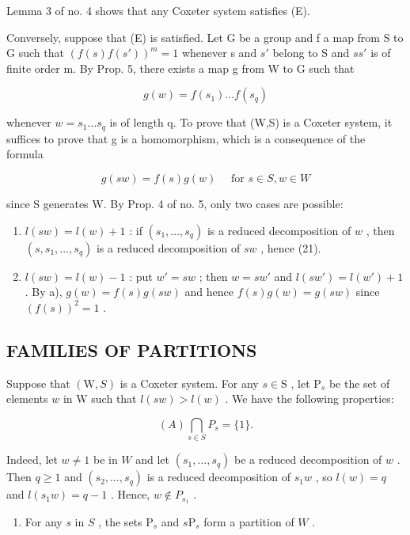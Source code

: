 Lemma 3 of no. 4 shows that any Coxeter system satisfies (E).

Conversely, suppose that (E) is satisfied. Let G be a group and f a map from S to G such that \((f(s)f(s'))^{m}=1\) whenever s and \(s'\) belong to S and \(ss'\) is of finite order m. By Prop. 5, there exists a map g from W to G such that

\[
g (w) = f (s _ {1}) \dots f (s _ {q})\tag{20}
\]

whenever \(w = s_{1} \ldots s_{q}\) is of length q. To prove that (W,S) is a Coxeter system, it suffices to prove that g is a homomorphism, which is a consequence of the formula

\[
g (s w) = f (s) g (w) \quad \text { for } s \in S, w \in W\tag{21}
\]

since S generates W. By Prop. 4 of no. 5, only two cases are possible:

\begin{enumerate}
\def\labelenumi{\alph{enumi})}
\item
  \(l(sw) = l(w) + 1\) : if \((s_1, \ldots, s_q)\) is a reduced decomposition of \(w\) , then \((s, s_1, \ldots, s_q)\) is a reduced decomposition of \(sw\) , hence (21).
\item
  \(l(sw) = l(w) - 1\) : put \(w' = sw\) ; then \(w = sw'\) and \(l(sw') = l(w') + 1\) . By a), \(g(w) = f(s)g(sw)\) and hence \(f(s)g(w) = g(sw)\) since \((f(s))^{2} = 1\) .
\end{enumerate}

\subsection{FAMILIES OF PARTITIONS}

Suppose that \((\mathrm{W}, S)\) is a Coxeter system. For any \(s \in \mathrm{S}\) , let \(\mathrm{P}_s\) be the set of elements \(w\) in \(\mathrm{W}\) such that \(l(sw) > l(w)\) . We have the following properties:

\[
(A) \bigcap_ {s \in S} P _ {s} = \{1 \}.
\]

Indeed, let \(w \neq 1\) be in \(W\) and let \((s_1, \ldots, s_q)\) be a reduced decomposition of \(w\) . Then \(q \geqslant 1\) and \((s_2, \ldots, s_q)\) is a reduced decomposition of \(s_1w\) , so \(l(w) = q\) and \(l(s_1w) = q - 1\) . Hence, \(w \notin P_{s_1}\) .

\begin{enumerate}
\def\labelenumi{(\Alph{enumi})}
\setcounter{enumi}{1}
\tightlist
\item
  For any \(s\) in \(S\) , the sets \(\mathrm{P}_s\) and \(s\mathrm{P}_s\) form a partition of \(W\) .
\end{enumerate}

